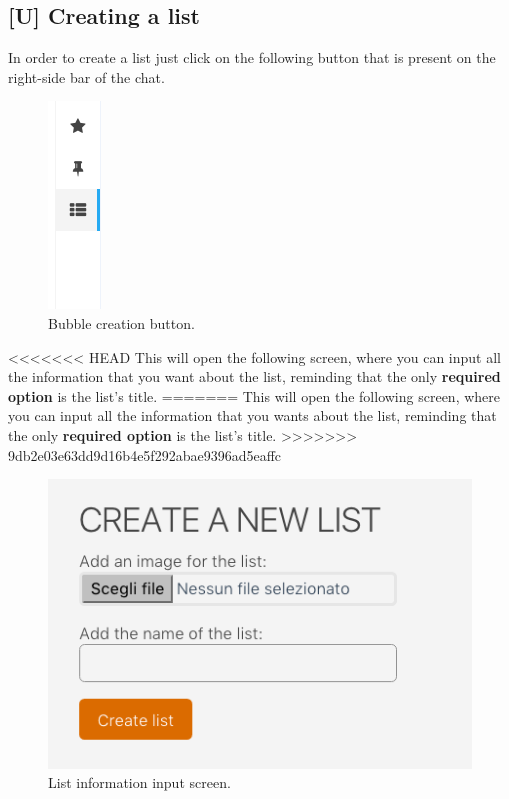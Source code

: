 \newpage
\subsection{[U] Creating a list}
In order to create a list just click on the following button that is present on the right-side bar of the chat.

\begin{figure}[H]
  \centering 
  \includegraphics[scale=1.0]{Sections/3-HowToUse/Images/create_list_button.png}
  \caption{Bubble creation button.}
\end{figure}

<<<<<<< HEAD
This will open the following screen, where you can input all the information that you want about the list, reminding that the only \textbf{required option} is the list's title.
=======
This will open the following screen, where you can input all the information that you wants about the list, reminding that the only \textbf{required option} is the list's title.
>>>>>>> 9db2e03e63dd9d16b4e5f292abae9396ad5eaffc

\begin{figure}[H]
  \centering 
  \includegraphics[scale=0.7]{Sections/3-HowToUse/Images/list_create.png}
  \caption{List information input screen.}
\end{figure}

